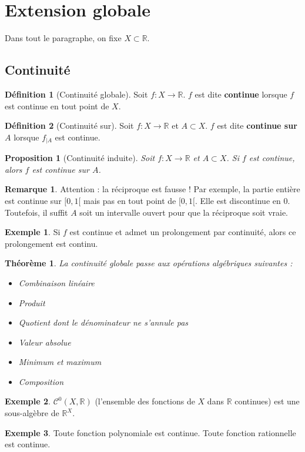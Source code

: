 \documentclass[french]{book}
\newcommand{\R}{\mathbb{R}}
\theoremstyle{plain}
\newtheorem{thm}{Théorème}[chapter]
\newtheorem{prop}{Proposition}[chapter]
\theoremstyle{definition}
\newtheorem{dfn}{Définition}[chapter]
\newtheorem{exa}{Exemple}[chapter]
\newtheorem{rmq}{Remarque}[chapter]
\theoremstyle{remark}
\begin{document}
\section{Extension globale}
Dans tout le paragraphe, on fixe $X\subset\R$.
\subsection{Continuité}
\begin{dfn}[Continuité globale]
	Soit $f:X\rightarrow\R$. $f$ est dite \textbf{continue} lorsque $f$ est continue en tout point de $X$.
\end{dfn}
\begin{dfn}[Continuité sur]
	Soit $f:X\rightarrow\R$ et $A\subset X$. $f$ est dite \textbf{continue sur $A$} lorsque $f_{|A}$ est continue.
\end{dfn}
\begin{prop}[Continuité induite]
	Soit $f:X\rightarrow\R$ et $A\subset X$. Si $f$ est continue, alors $f$ est continue sur $A$.
\end{prop}
\begin{rmq}
	Attention : la réciproque est fausse ! Par exemple, la partie entière est continue sur $[0,1[$ mais pas en tout point de $[0,1[$. Elle est discontinue en $0$. Toutefois, il suffit $A$ soit un intervalle ouvert pour que la réciproque soit vraie.
\end{rmq}
\begin{exa}
	Si $f$ est continue et admet un prolongement par continuité, alors ce prolongement est continu.
\end{exa}
\begin{thm}
	La continuité globale passe aux opérations algébriques suivantes : 
	\begin{itemize}
		\item Combinaison linéaire
		\item Produit
		\item Quotient dont le dénominateur ne s'annule pas
		\item Valeur absolue
		\item Minimum et maximum
		\item Composition
	\end{itemize}
\end{thm}
\begin{exa}
	$\mathcal{C}^0(X,\R)$ (l'ensemble des fonctions de $X$ dans $\R$ continues) est une sous-algèbre de $\R^X$.
\end{exa}
\begin{exa}
	Toute fonction polynomiale est continue. Toute fonction rationnelle est continue.
\end{exa}
\end{document}
